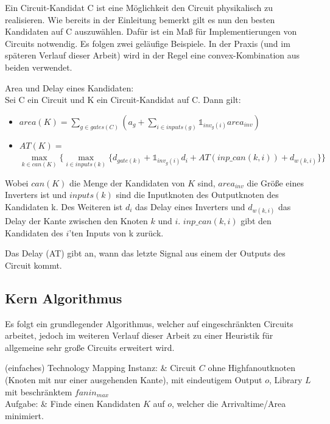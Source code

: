 \documentclass[11pt, a4paper, german]{article}
\begin{document}
Ein Circuit-Kandidat C ist eine Möglichkeit den Circuit physikalisch zu realisieren. Wie bereits in der Einleitung bemerkt gilt es nun den besten Kandidaten auf C auszuwählen. Dafür ist ein Maß für Implementierungen von Circuits notwendig. Es folgen zwei geläufige Beispiele. In der Praxis (und im späteren Verlauf dieser Arbeit) wird in der Regel eine convex-Kombination aus beiden verwendet.

\begin{definition}{Area und Delay eines Kandidaten:}\\
Sei C ein Circuit und K ein Circuit-Kandidat auf C. Dann gilt: \\
\begin{itemize}
\item $area(K) = \sum_{g \in gates(C)} (a_g + \sum_{i \in inputs(g)} \mathbb{1}_{inv_g(i)} area_{inv})$ 
\item $AT(K) = $\\$  \max\limits_{k \in can(K)} \{\max\limits_{i \in inputs(k)} \{   d_{gate(k)} + \mathbb{1}_{inv_g(i)} d_{i} + AT(inp\_can(k,i)) + d_{w(k,i)} \} \}$ 
\end{itemize}
Wobei $can(K)$ die Menge der Kandidaten von $K$ sind, $area_{inv}$ die Größe eines Inverters ist und $inputs(k)$ sind die Inputknoten des Outputknoten des Kandidaten k. Des Weiteren ist $d_i$ das Delay eines Inverters und $d_{w(k,i)} $ das Delay der Kante zwischen den Knoten $k$ und $i$. $inp\_can(k,i)$ gibt den Kandidaten des $i$'ten Inputs von k zurück. 

\end{definition}

Das Delay (AT) gibt an, wann das letzte Signal aus einem der Outputs des Circuit kommt.

\subsection{Kern Algorithmus}
\label{subsec:kern_algorithmus}

Es folgt ein grundlegender Algorithmus, welcher auf eingeschränkten Circuits arbeitet, jedoch im weiteren Verlauf dieser Arbeit zu einer Heuristik für allgemeine sehr große Circuits erweitert wird.

\begin{problem}[framed]{(einfaches) Technology Mapping}
  Instanz:  & Circuit $C$ ohne Highfanoutknoten (Knoten mit nur einer ausgehenden Kante), mit eindeutigem Output $o$, Library $L$ mit beschr\"anktem $fanin_{max}$\\
  Aufgabe: &  Finde einen Kandidaten $K$ auf $o$, welcher die Arrivaltime/Area minimiert.
\end{problem}
\end{document}
